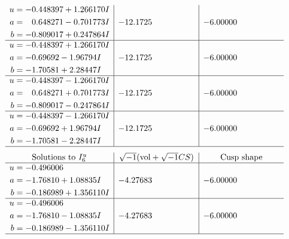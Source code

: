 \documentclass[1p]{elsarticle_modified}
\theoremstyle{definition}
\newcommand{\I}{\sqrt{-1}}
\begin{document}
$$\begin{array}{c|c|c}
\begin{aligned}
u &= -0.448397 + 1.266170 I \\
a &= \phantom{-}0.648271 - 0.701773 I \\
b &= -0.809017 + 0.247864 I\end{aligned}
 & -12.1725\phantom{ +0.000000I} & -6.00000\phantom{ +0.000000I} \\ \hline\begin{aligned}
u &= -0.448397 + 1.266170 I \\
a &= -0.69692 - 1.96794 I \\
b &= -1.70581 + 2.28447 I\end{aligned}
 & -12.1725\phantom{ +0.000000I} & -6.00000\phantom{ +0.000000I} \\ \hline\begin{aligned}
u &= -0.448397 - 1.266170 I \\
a &= \phantom{-}0.648271 + 0.701773 I \\
b &= -0.809017 - 0.247864 I\end{aligned}
 & -12.1725\phantom{ +0.000000I} & -6.00000\phantom{ +0.000000I} \\ \hline\begin{aligned}
u &= -0.448397 - 1.266170 I \\
a &= -0.69692 + 1.96794 I \\
b &= -1.70581 - 2.28447 I\end{aligned}
 & -12.1725\phantom{ +0.000000I} & -6.00000\phantom{ +0.000000I}\\
 \hline 
 \end{array}$$\newpage$$\begin{array}{c|c|c}  
\text{Solutions to }I^u_{6}& \I (\text{vol} + \sqrt{-1}CS) & \text{Cusp shape}\\
 \hline 
\begin{aligned}
u &= -0.496006\phantom{ +0.000000I} \\
a &= -1.76810 + 1.08835 I \\
b &= -0.186989 + 1.356110 I\end{aligned}
 & -4.27683\phantom{ +0.000000I} & -6.00000\phantom{ +0.000000I} \\ \hline\begin{aligned}
u &= -0.496006\phantom{ +0.000000I} \\
a &= -1.76810 - 1.08835 I \\
b &= -0.186989 - 1.356110 I\end{aligned}
 & -4.27683\phantom{ +0.000000I} & -6.00000\phantom{ +0.000000I}\\
 \hline 
 \end{array}$$\newpage\newpage\renewcommand{\arraystretch}{1}
\end{document}
